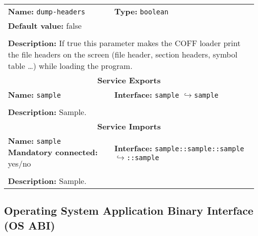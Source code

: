\begin{center}
\begin{tabular}{|p{7.5cm}|p{7.5cm}|}
		\hline
		\hline
		\multicolumn{1}{|p{7.5cm}}{\textbf{Name:} \texttt{dump-headers}} & \multicolumn{1}{p{7.5cm}|}{\textbf{Type:} \texttt{boolean}}\\
		\multicolumn{2}{|p{15cm}|}{\textbf{Default value:} false}\\
		\multicolumn{2}{|l|}{}\\
		\multicolumn{2}{|p{15cm}|}{\textbf{Description:} \newline If true this parameter makes the COFF loader print the file headers on the screen (file header, section headers, symbol table \ldots) while loading the program.}\\
		\hline
		\hline
		\multicolumn{2}{|c|}{\textbf{\large Service Exports}}\\
		\hline
		\multicolumn{1}{|p{7.5cm}}{\textbf{Name:} \texttt{sample}} & \multicolumn{1}{p{7.5cm}|}{\textbf{Interface:} \newline \texttt{sample} \newline$\hookrightarrow$\texttt{sample}}\\
		\multicolumn{2}{|l|}{}\\
		\multicolumn{2}{|p{15cm}|}{\textbf{Description:} \newline Sample.}\\
		\hline
		\hline
		\multicolumn{2}{|c|}{\textbf{\large Service Imports}}\\
		\hline
		\multicolumn{1}{|p{7.5cm}}{\textbf{Name:} \texttt{sample} \newline \textbf{Mandatory connected:} yes/no} & \multicolumn{1}{p{7.5cm}|}{\textbf{Interface:} \newline \texttt{sample::sample::sample} \newline$\hookrightarrow$\texttt{::sample}}\\
		\multicolumn{2}{|l|}{}\\
		\multicolumn{2}{|p{15cm}|}{\textbf{Description:} \newline Sample.}\\
		\hline
	\end{tabular}
\end{center}

\subsection{Operating System Application Binary Interface (OS ABI)}

